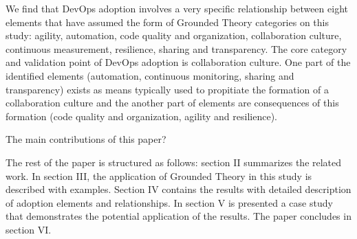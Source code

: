 We find that DevOps adoption involves a very specific relationship between
eight elements that have assumed the form of Grounded Theory categories on
this study: agility, automation, code quality and organization, collaboration
culture, continuous measurement, resilience, sharing and transparency. The
core category and validation point of DevOps adoption is collaboration culture.
One part of the identified elements (automation, continuous monitoring, sharing
and transparency) exists as means typically used to propitiate the formation
of a collaboration culture and the another part of elements are consequences
of this formation (code quality and organization, agility and resilience).

The main contributions of this paper?

The rest of the paper is structured as follows: section II summarizes the
related work. In section III, the application of Grounded Theory in this study
is described with examples. Section IV contains the results with detailed
description of adoption elements and relationships. In section V is presented
a case study that demonstrates the potential application of the results. The
paper concludes in section VI.
